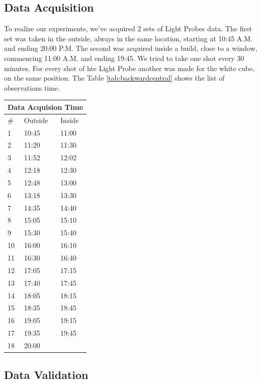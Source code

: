 \documentclass[conference]{acmsiggraph}
\begin{document}
\subsection{Data Acquisition}
	To realize our experiments, we've acquired 2 sets of Light Probes data. The first set was taken in the outside, always in the same location, starting at
10:45 A.M. and ending 20:00 P.M. The second was acquired inside a build, close to a window, commencing 11:00 A.M. and ending 19:45. We tried to take one shot
every 30 minutes. For every shot of hte Light Probe another was made for the white cube, on the same position. The Table \ref{tab:backwardcentral} 
shows the list of observations time.
\begin{center}
    \begin{tabular}{| l | l | l |}
	\hline
    \multicolumn{3}{|c|}{Data Acquision Time} \\
    \hline
    \# & Outside & Inside \\
    \hline
    1 & 10:45 & 11:00 \\
    \hline
    2 & 11:20 & 11:30 \\
    \hline
    3 & 11:52 & 12:02 \\
    \hline
    4 & 12:18 & 12:30 \\
    \hline
    5 & 12:48 & 13:00 \\
    \hline
	6 & 13:18 & 13:30 \\
    \hline
	7 & 14:35 & 14:40 \\
    \hline
	8 & 15:05 & 15:10 \\
    \hline
    9 & 15:30 & 15:40 \\
    \hline
	10 & 16:00 & 16:10 \\
    \hline
	11 & 16:30 & 16:40 \\
    \hline
	12 & 17:05 & 17:15 \\
    \hline
	13 & 17:40 & 17:45 \\
    \hline
	14 & 18:05 & 18:15 \\
    \hline
	15 & 18:35 & 18:45 \\
    \hline
	16 & 19:05 & 19:15 \\
    \hline
	17 & 19:35 & 19:45 \\
    \hline
	18 & 20:00 & \\
    \hline
    \end{tabular}
    \label{tab:backwardcentral}
\end{center}

\subsection{Data Validation}
\end{document}
